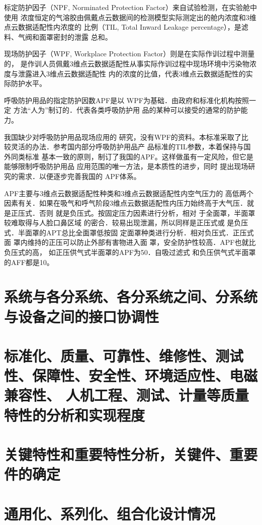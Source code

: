 \documentclass[a4paper,12pt]{ctexbook}	%
\begin{document}
标定防护因子（NPF, Norminated Protection Factor）来自试验检测，在实验舱中使用
浓度恒定的气溶胶由佩戴点云数据间的检测模型实际测定出的舱内浓度和3维点云数据适配性内浓度的
比例（TIL, Total Inward Leakage percentage），是滤料、气阀和面罩密封的泄露
总和。

现场防护因子（WPF, Workplace Protection Factor）则是在实际作训过程中测量的，
是作训人员佩戴3维点云数据适配性从事实际作训过程中现场环境中污染物浓度与泄露进入3维点云数据适配性
内的浓度的比值，代表3维点云数据适配性的实际防护水平。

呼吸防护用品的指定防护因数APF是以
WPF为基础．由政府和标准化机构按照一定
方法“人为”制订的．代表各类呼吸防护用
品的某种可以接受的通常的防护能力。

我国缺少对呼吸防护用品现场应用的
研究，没有WPF的资料。本标准采取了比
较灵活的办法．参考国内部分呼吸防护用品产
品标准的TIL参数，本着保持与国外同类标准
基本一致的原则，制订了我国的APF。这样做虽有一定风险，但它是能够限制呼吸防护用品
应用范围的唯一方法，是本质性的进步，同时
提出现场研究的需求．以便逐步完善我国的
APF体系。


APF主要与3维点云数据适配性种类和3维点云数据适配性内空气压力的
高低两个因素有关．如果在吸气和呼气阶段3维点云数据适配性内压力始终高于大气压．就是正压式．否则
就是负压式。按固定压力因素进行分析，相对
于全面罩，半面罩较难取得与人脸口鼻区域
的密合．较易出现泄漏，所以同样是正压式或
是负压式．半面罩的APT总比全面罩低按固
定面罩种类进行分析．相对负压式．正压式面
罩内维持的正压可以防止外部有害物进入面
罩，安全防护性较高．APF也就比负压式的高，
如正压供气式半面罩的APF为50．自吸过滤式
和负压供气式半面罩的AFF都是10。


\section{系统与各分系统、各分系统之间、分系统与设备之间的接口协调性}

\section{标准化、质量、可靠性、维修性、测试性、保障性、安全性、环境适应性、电磁兼容性、
人机工程、测试、计量等质量特性的分析和实现程度}

\section{关键特性和重要特性分析，关键件、重要件的确定}

\section{通用化、系列化、组合化设计情况}
\end{document}
